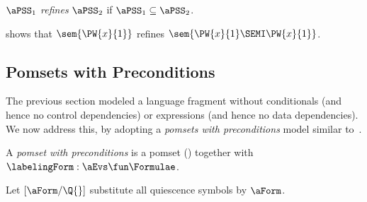 \begin{definition}
  $\aPSS_1$ \emph{refines} $\aPSS_2$ if $\aPSS_1\subseteq\aPSS_2$.
\end{definition}

\begin{example}
   shows that $\sem{\PW{x}{1}}$ refines $\sem{\PW{x}{1}\SEMI\PW{x}{1}}$.
\end{example}

\subsection{Pomsets with Preconditions}
\label{sec:pomsets-pre}

The previous section modeled a language fragment without conditionals (and hence no
control dependencies) or expressions (and hence no data dependencies). We now
address this, by adopting a \emph{pomsets with preconditions} model
similar to~\cite{DBLP:journals/pacmpl/JagadeesanJR20}.

\begin{definition}
  A \emph{pomset with preconditions} is
  a pomset () together with $\labelingForm:\aEvs\fun\Formulae$.
\end{definition}
\begin{definition}
  \label{def:q-sub}
  Let $[\aForm/\Q{}]$ substitute all quiescence symbols by $\aForm$.
\end{definition}



